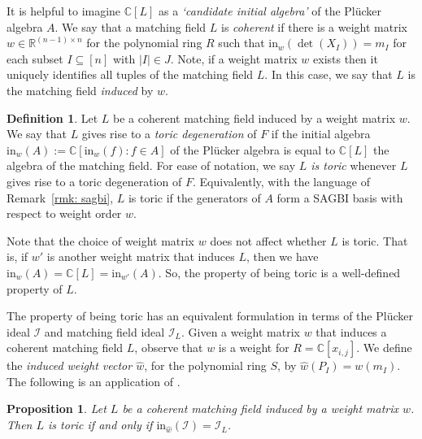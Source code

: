 \documentclass[11pt]{article}
\newcommand{\CC}{\mathbb C}
\newcommand{\RR}{\mathbb R}
\newcommand{\MI}{\mathcal I}
\newcommand{\init}{\text{in}}
\theoremstyle{plain}
\newtheorem{proposition}[theorem]{Proposition}
\theoremstyle{definition}
\newtheorem{definition}[theorem]{Definition}
\theoremstyle{remark}
\begin{document}
It is helpful to imagine $\CC[L]$ as a \textit{`candidate initial algebra'} of the Pl\"ucker algebra $A$. We say that a matching field $L$ is \textit{coherent} if there is a weight matrix $w \in \RR^{(n-1) \times n}$ for the polynomial ring $R$ such that $\init_w(\det(X_I)) = m_I$ for each subset $I \subseteq [n]$ with $|I| \in J$. Note, if a weight matrix $w$ exists then it uniquely identifies all tuples of the matching field $L$. In this case, we say that $L$ is the matching field \textit{induced} by $w$. 

\begin{definition}\label{def: bg toric degen}
    Let $L$ be a coherent matching field induced by a weight matrix $w$. We say that $L$ gives rise to a \textit{toric degeneration} of $F$ if the initial algebra $\init_w(A) := \CC[\init_w(f) \colon f \in A]$ of the Pl\"ucker algebra is equal to $\CC[L]$ the algebra of the matching field. For ease of notation, we say \textit{$L$ is toric} whenever $L$ gives rise to a toric degeneration of $F$. Equivalently, with the language of Remark~\ref{rmk: sagbi}, $L$ is toric if the generators of $A$ form a SAGBI basis with respect to weight order $w$.
\end{definition} 

Note that the choice of weight matrix $w$ does not affect whether $L$ is toric. That is, if $w'$ is another weight matrix that induces $L$, then we have $\init_w(A) = \CC[L] = \init_{w'}(A)$. So, the property of being toric is a well-defined property of $L$. 


The property of being toric has an equivalent formulation in terms of the Pl\"ucker ideal $\MI$ and matching field ideal $\MI_L$. Given a weight matrix $w$ that induces a coherent matching field $L$, observe that $w$ is a weight for $R = \CC[x_{i,j}]$. We define the \textit{induced weight vector $\widehat w$}, for the polynomial ring $S$, by
$\widehat w(P_I) = w(m_I)$. The following is an application of \cite[Theorem~11.4]{sturmfels1996grobner}.

\begin{proposition}\label{prop: toric degen ideals}
    Let $L$ be a coherent matching field induced by a weight matrix $w$. Then $L$ is toric if and only if $\init_{\widehat w}(\MI) = \MI_L$.
\end{proposition}
\end{document}
